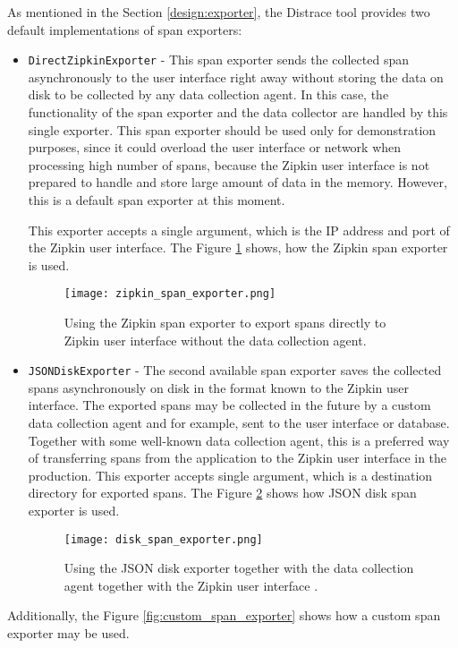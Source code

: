 As mentioned in the Section \ref{design:exporter}, the Distrace tool provides two default implementations of span exporters:
\begin{itemize}
	\item  \texttt{DirectZipkinExporter} -  This span exporter sends the collected span asynchronously to the user interface right away without storing the data on disk to be collected by any data collection agent. In this case, the functionality of the span exporter and the data collector are handled by this single exporter.
	This span exporter should be used only for demonstration purposes, since it could overload the user interface or network when processing high number of spans, because the Zipkin user interface is not prepared to handle and store large amount of data in the memory. However, this is a default span exporter at this moment.
	
	This exporter accepts a single argument, which is the IP address and port of the Zipkin user interface. The Figure \ref{fig:zipkin_span_exporter} shows, how the Zipkin span exporter is used.
	
	\begin{figure}
		\centering
		\texttt{[image: zipkin\_span\_exporter.png]}
		\caption{Using the Zipkin span exporter to export spans directly to Zipkin user interface without the data collection agent.}
		\label{fig:zipkin_span_exporter}
	\end{figure}
	\item  \texttt{JSONDiskExporter} - The second available span exporter saves the collected spans asynchronously on disk in the format known to the Zipkin user interface. The exported spans may be collected in the future by a custom data collection agent and for example, sent to the user interface or database. Together with some well-known data collection agent, this is a preferred way of transferring spans from the application to the Zipkin user interface in the production. This exporter accepts single argument, which is a destination directory for exported spans. The Figure \ref{fig:disk_span_exporter} shows how JSON disk span exporter is used.
	\begin{figure}
		\centering
		\texttt{[image: disk\_span\_exporter.png]}
		\caption{Using the JSON disk exporter together with the data collection agent together with the Zipkin user interface .}
		\label{fig:disk_span_exporter}
	\end{figure}
\end{itemize}
Additionally, the Figure \ref{fig:custom_span_exporter} shows how a custom span exporter may be used.

